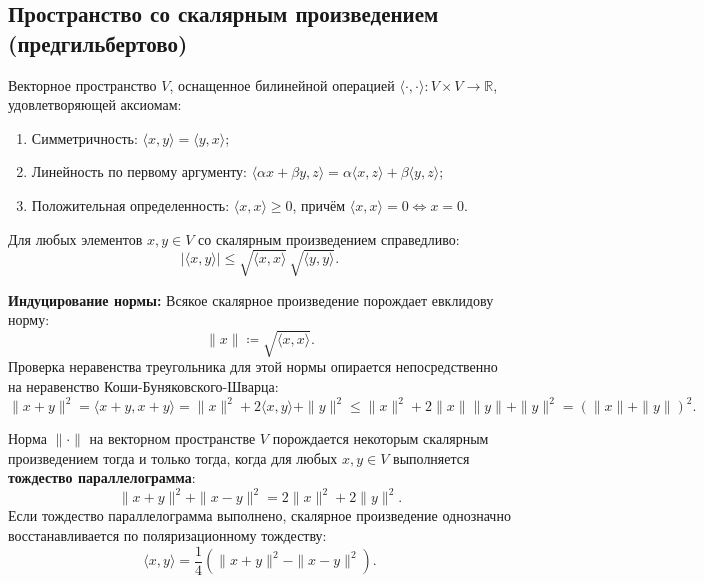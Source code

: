     \subsection{Пространство со скалярным произведением (предгильбертово)}
    Векторное пространство $V$, оснащенное билинейной операцией $\langle \cdot, \cdot \rangle \colon V \times V \to
    \mathbb{R}$, удовлетворяющей аксиомам:
    \begin{enumerate}
        \item Симметричность: $\langle x, y \rangle = \langle y, x \rangle$;
        \item Линейность по первому аргументу: $\langle \alpha x + \beta y, z \rangle = \alpha \langle x, z \rangle +
        \beta \langle y, z \rangle$;
        \item Положительная определенность: $\langle x, x \rangle \ge 0$, причём $\langle x, x \rangle = 0 \iff x = 0$.
    \end{enumerate}

    \begin{theorem}
Для любых элементов $x, y \in V$ со скалярным произведением справедливо:
\[ |\langle x, y \rangle| \le \sqrt{\langle x, x \rangle} \, \sqrt{\langle y, y \rangle}. \]
    \end{theorem}

    \textbf{Индуцирование нормы:} Всякое скалярное произведение порождает евклидову норму:
    \[ \|x\| \coloneqq \sqrt{\langle x, x \rangle}. \]
    Проверка неравенства треугольника для этой нормы опирается непосредственно на неравенство Коши-Буняковского-Шварца:
    \[ \|x + y\|^2 = \langle x+y, x+y \rangle = \|x\|^2 + 2\langle x, y \rangle + \|y\|^2 \le \|x\|^2 + 2\|x\|\|y\| +
    \|y\|^2 = (\|x\| + \|y\|)^2. \]

    \begin{theorem}
Норма $\|\cdot\|$ на векторном пространстве $V$ порождается некоторым скалярным произведением тогда и только тогда,
когда для любых $x, y \in V$ выполняется \textbf{тождество параллелограмма}:
\[ \|x + y\|^2 + \|x - y\|^2 = 2\|x\|^2 + 2\|y\|^2. \]
Если тождество параллелограмма выполнено, скалярное произведение однозначно восстанавливается по поляризационному
тождеству:
\[ \langle x, y \rangle = \frac{1}{4}\left(\|x + y\|^2 - \|x - y\|^2\right). \]
    \end{theorem}

